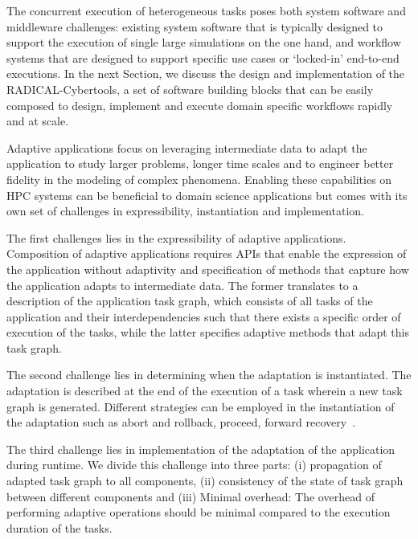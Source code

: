 \documentclass[conference]{IEEEtran}
\begin{document}
The concurrent execution of heterogeneous tasks poses both system software
and middleware challenges: existing system software that is typically
designed to support the execution of single large simulations on the one
hand, and workflow systems that are designed to support specific use cases or
`locked-in' end-to-end executions. In the next Section, we discuss the design
and implementation of the RADICAL-Cybertools, a set of software building
blocks that can be easily composed to design, implement and execute domain
specific workflows rapidly and at scale.

Adaptive applications focus on leveraging intermediate data to adapt the
application to study larger problems, longer time scales and to engineer
better fidelity in the modeling of complex phenomena. Enabling these
capabilities on HPC systems can be beneficial to domain science applications
but comes with its own set of challenges in expressibility, instantiation and
implementation.

The first challenges lies in the expressibility of adaptive applications.
Composition of adaptive applications requires APIs that enable the expression
of the application without adaptivity and specification of methods that
capture how the application adapts to intermediate data. The former
translates to a description of the application task graph, which consists of
all tasks of the application and their interdependencies such that there
exists a specific order of execution of the tasks, while the latter specifies
adaptive methods that adapt this task graph.

The second challenge lies in determining when the adaptation is instantiated.
The adaptation is described at the end of the execution of a task wherein a
new task graph is generated. Different strategies can be employed in the
instantiation of the adaptation such as abort and rollback, proceed, forward
recovery~\cite{van2000dealing}.

The third challenge lies in implementation of the adaptation of the
application during runtime. We divide this challenge into three parts: (i)
propagation of adapted task graph to all components, (ii) consistency of the
state of task graph between different components and (iii) Minimal overhead:
The overhead of performing adaptive operations should be minimal compared to
the execution duration of the tasks.


\end{document}
